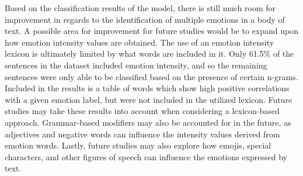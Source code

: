 \documentclass{icsthesis}
\begin{document}
\begin{mainmatter}
            Based on the classification results of the model, there is still much room for improvement in regards to the identification of multiple emotions in a body of text. A possible area for improvement for future studies would be to expand upon how emotion intensity values are obtained. The use of an emotion intensity lexicon is ultimately limited by what words are included in it. Only 61.5\% of the sentences in the dataset included emotion intensity, and so the remaining sentences were only able to be classified based on the presence of certain n-grams. Included in the results is a table of words which show high positive correlations with a given emotion label, but were not included in the utilized lexicon. Future studies may take these results into account when considering a lexicon-based approach. Grammar-based modifiers may also be accounted for in the future, as adjectives and negative words can influence the intensity values derived from emotion words. Lastly, future studies may also explore how emojis, special characters, and other figures of speech can influence the emotions expressed by text.
		\restoregeometry
			
	\end{mainmatter}
\end{document}
